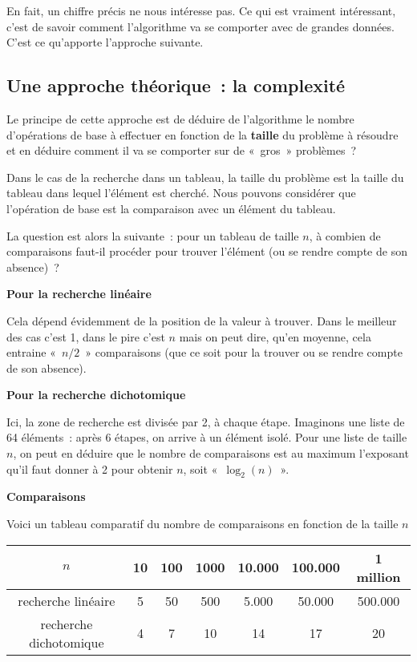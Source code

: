 			En fait, un chiffre précis ne nous intéresse pas.  Ce qui est
			vraiment intéressant, c’est de savoir comment l’algorithme va se
			comporter avec de grandes données.  C’est ce qu’apporte l’approche
			suivante.
		
		\subsection{Une approche théorique~: la complexité}
		
			Le principe de cette approche est de déduire de l'algorithme le
			nombre d’opérations de base à effectuer en fonction de la
			\textbf{taille} du problème à résoudre et en déduire comment il va
			se comporter sur de «~gros~» problèmes~?
		
			Dans le cas de la recherche dans un tableau, la taille du problème
			est la taille du tableau dans lequel l'élément est cherché.  Nous
			pouvons considérer que l’opération de base est la comparaison avec
			un élément du tableau. 
			
			La question est alors la suivante~: pour un tableau de taille $n$,
			à combien de comparaisons faut-il procéder pour trouver l’élément
			(ou se rendre compte de son absence)~?
		
			\clearpage
			{\bfseries
			Pour la recherche linéaire}
		
				Cela dépend évidemment de la position de la valeur à trouver. 
				Dans le meilleur des cas c’est 1, 
				dans le pire c’est $n$ mais on peut dire, 
				qu’en moyenne, 
				cela entraine «~$n/2$~» comparaisons 
				(que ce soit pour la trouver ou se rendre compte de son absence).
		
			{\bfseries
			Pour la recherche dichotomique}
		
				Ici, la zone de recherche est divisée par 2, à chaque étape. 
				Imaginons une liste de 64 éléments~: 
				après 6 étapes, on arrive à un élément isolé. 
				Pour une liste de taille $n$, 
				on peut en déduire que le nombre de comparaisons 
				est au maximum l’exposant qu’il faut donner à 2 pour obtenir $n$, 
				soit «~$\log_2(n)$~».
		
			{\sffamily\bfseries\upshape
			Comparaisons}
		
			Voici un tableau comparatif du nombre de comparaisons en fonction de
			la taille $n$
		
			\begin{center}
				\small
				\begin{tabular}{|c|c|c|c|c|c|c|}
			\hline
			\rowcolor{black!40}
			$n$ & 10 & 100 & 1000 & 10.000 & 100.000 & 1 million \\
			\hline
			recherche linéaire & 5 & 50 & 500 & 5.000 & 50.000 & 500.000 \\
			\hline
			recherche dichotomique & 4 & 7 & 10 & 14 & 17 & 20 \\
			\hline
			\end{tabular}
			\end{center}
			
